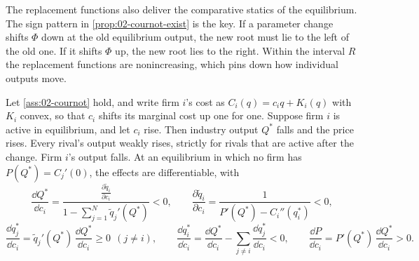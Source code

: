 The replacement functions also deliver the comparative statics of the equilibrium. The sign pattern in
\cref{prop:02-cournot-exist} is the key. If a parameter change shifts $\Phi$ down at the old equilibrium output, the
new root must lie to the left of the old one. If it shifts $\Phi$ up, the new root lies to the right. Within the
interval $R$ the replacement functions are nonincreasing, which pins down how individual outputs move.

\begin{proposition}\label{prop:02-cournot-cs}
Let \cref{ass:02-cournot} hold, and write firm $i$'s cost as $C_i(q) = c_iq + K_i(q)$ with $K_i$ convex, so that
$c_i$ shifts its marginal cost up one for one. Suppose firm $i$ is active in equilibrium, and let $c_i$ rise. Then
industry output $Q^*$ falls and the price rises. Every rival's output weakly rises, strictly for rivals that are
active after the change. Firm $i$'s output falls. At an equilibrium in which no firm has $P(Q^*) = C_j'(0)$, the
effects are differentiable, with
\begin{equation}\label{eq:02-dQdc}
  \frac{\dd Q^*}{\dd c_i} = \frac{\frac{\partial \tilde q_i}{\partial c_i}}{1 - \sum_{j=1}^N \tilde q_j'(Q^*)} < 0,
  \qquad \frac{\partial \tilde q_i}{\partial c_i} = \frac{1}{P'(Q^*) - C_i''(q_i^*)} < 0,
\end{equation}
\[
  \frac{\dd q_j^*}{\dd c_i} = \tilde q_j'(Q^*)\,\frac{\dd Q^*}{\dd c_i} \ge 0 \ \ (j \ne i), \qquad
  \frac{\dd q_i^*}{\dd c_i} = \frac{\dd Q^*}{\dd c_i} - \sum_{j \ne i}\frac{\dd q_j^*}{\dd c_i} < 0, \qquad
  \frac{\dd P}{\dd c_i} = P'(Q^*)\,\frac{\dd Q^*}{\dd c_i} > 0 .
\]
\end{proposition}

